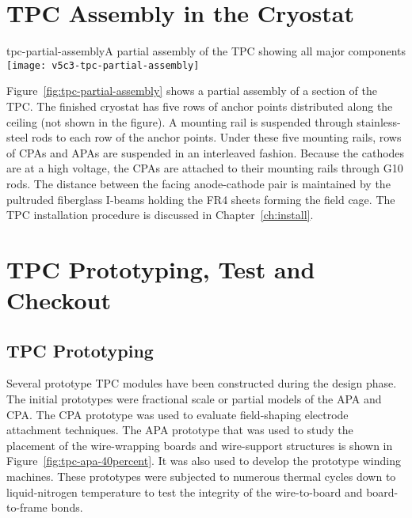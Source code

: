 \section{TPC Assembly in the Cryostat}


\begin{cdrfigure}{tpc-partial-assembly}{A partial assembly of the TPC showing all major components}
\texttt{[image: v5c3-tpc-partial-assembly]}
\end{cdrfigure}


Figure~\ref{fig:tpc-partial-assembly} shows a partial assembly of a section of the TPC. The finished cryostat has five rows of anchor points distributed along the ceiling (not shown in the figure). A mounting rail is suspended through stainless-steel rods to each row of the anchor points. Under these five mounting rails, rows of CPAs and APAs are suspended in an interleaved fashion. Because the cathodes are at a high voltage, the CPAs are attached to their mounting rails through G10 rods. The distance between the facing anode-cathode pair is maintained by the pultruded fiberglass I-beams holding the FR4 sheets forming the field cage. The TPC installation procedure is discussed in  Chapter~\ref{ch:install}.


\section{TPC Prototyping, Test and  Checkout}
\label{sec:v5-tpc-checkout}

\subsection{TPC Prototyping}
\label{sec:v5-tpc-checkout-prototype}

Several prototype TPC modules have been constructed during the design phase. The initial prototypes were fractional scale or partial models of the APA and CPA. The CPA prototype was used to evaluate field-shaping electrode attachment techniques. The APA prototype that was used to study the placement of the wire-wrapping boards and wire-support structures is shown in Figure~\ref{fig:tpc-apa-40percent}. It was also used to develop the prototype winding machines. These prototypes were subjected to numerous thermal cycles down to liquid-nitrogen temperature to test the integrity of the wire-to-board and board-to-frame bonds. 


